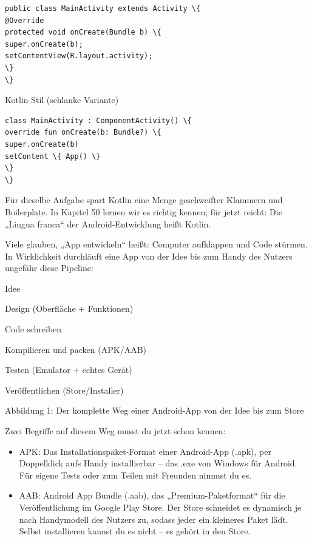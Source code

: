 \begin{lstlisting}
public class MainActivity extends Activity \{
@Override
protected void onCreate(Bundle b) \{
super.onCreate(b);
setContentView(R.layout.activity);
\}
\}
\end{lstlisting}

Kotlin-Stil (schlanke Variante)

\begin{lstlisting}
class MainActivity : ComponentActivity() \{
override fun onCreate(b: Bundle?) \{
super.onCreate(b)
setContent \{ App() \}
\}
\}
\end{lstlisting}

Für dieselbe Aufgabe spart Kotlin eine Menge geschweifter Klammern und Boilerplate. In Kapitel 50 lernen wir es richtig kennen; für jetzt reicht: Die „Lingua franca“ der Android-Entwicklung heißt Kotlin.


Viele glauben, „App entwickeln“ heißt: Computer aufklappen und Code stürmen. In Wirklichkeit durchläuft eine App von der Idee bis zum Handy des Nutzers ungefähr diese Pipeline:

Idee

Design (Oberfläche + Funktionen)

Code schreiben

Kompilieren und packen (APK/AAB)

Testen (Emulator + echtes Gerät)

Veröffentlichen (Store/Installer)

\begin{center}\small\color{gray}Abbildung 1: Der komplette Weg einer Android-App von der Idee bis zum Store\end{center}

Zwei Begriffe auf diesem Weg musst du jetzt schon kennen:

\begin{itemize}
  \item APK: Das Installationspaket-Format einer Android-App (.apk), per Doppelklick aufs Handy installierbar – das .exe von Windows für Android. Für eigene Tests oder zum Teilen mit Freunden nimmst du es.
  \item AAB: Android App Bundle (.aab), das „Premium-Paketformat“ für die Veröffentlichung im Google Play Store. Der Store schneidet es dynamisch je nach Handymodell des Nutzers zu, sodass jeder ein kleineres Paket lädt. Selbst installieren kannst du es nicht – es gehört in den Store.
\end{itemize}

